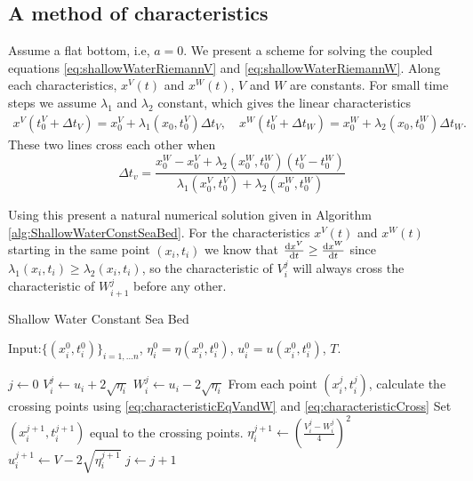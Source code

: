 \documentclass[11pt]{article}
\begin{document}
\subsection{A method of characteristics}
Assume a flat bottom, i.e, $a = 0$. We present a scheme for solving the coupled equations \eqref{eq:shallowWaterRiemannV} and \eqref{eq:shallowWaterRiemannW}. Along each characteristics, $x^V(t)$ and $x^W(t)$, $V$ and $W$ are constants. For small time steps we assume $\lambda_1$ and $\lambda_2$ constant, which gives the linear characteristics
\begin{align}
	\label{eq:characteristicEqVandW}
	x^V(t^V_0+\Delta t_V) = x^V_0 + \lambda_1(x_0,t^V_0)\Delta t_V ,\quad x^W(t^V_0+\Delta t_W) = x^W_0 + \lambda_2(x_0,t_0^W)\Delta t_W.
\end{align}
These two lines cross each other when 
\begin{equation}
	\label{eq:characteristicCross}
	\Delta t_v = \frac{x_0^W - x_0^V + \lambda_2(x_0^W,t_0^W)(t_0^V - t_0^W)}{\lambda_1(x_0^V,t_0^V)+\lambda_2(x_0^W,t_0^W)}
\end{equation}

Using this present a natural numerical solution given in  Algorithm \ref{alg:ShallowWaterConstSeaBed}.  
For the characteristics $x^V(t)$ and $x^W(t)$ starting in the same point $(x_i,t_i)$ we know that $\frac{\operatorname{d}\! x^V}{\operatorname{d}\! t}\geq \frac{\operatorname{d}\! x^W}{\operatorname{d}\! t}$ since $\lambda_1(x_i,t_i)\geq \lambda_2(x_i,t_i)$, so the characteristic of $V_i^j$ will always cross the characteristic of $W_{i+1}^j$ before any other. 
\begin{algorithm}
	\caption{Shallow Water Constant Sea Bed}
	\begin{algorithmic}[1]
		\State    Input:$\{(x^0_i,t^0_i)\}_{i=1,\ldots n}$, $\eta^0_i=\eta(x^0_i,t^0_i)$, $u^0_i = u(x_i^0,t^0_i)$,  $T$.

		\State $j\leftarrow 0$
		\State $V^j_i \leftarrow u_i + 2\sqrt{\eta_i}$
		\State $W^j_i \leftarrow u_i - 2\sqrt{\eta_i}$
		\State From each point $(x^j_i,t^j_i)$, calculate the crossing points using 		
		\eqref{eq:characteristicEqVandW} and \eqref{eq:characteristicCross}
		\State Set $(x^{j+1}_i,t^{j+1}_i)$ equal to the crossing points.
		\State $\eta_i^{j+1} \leftarrow \left(\frac{V_i^j -W_i^j}{4}\right)^2$
		\State $u_i^{j+1} \leftarrow V - 2\sqrt{\eta_i^{j+1}}$
		\State $j\leftarrow j + 1$
		\EndWhile
	\end{algorithmic}
	\label{alg:ShallowWaterConstSeaBed}
\end{algorithm}
%
%
\end{document}
